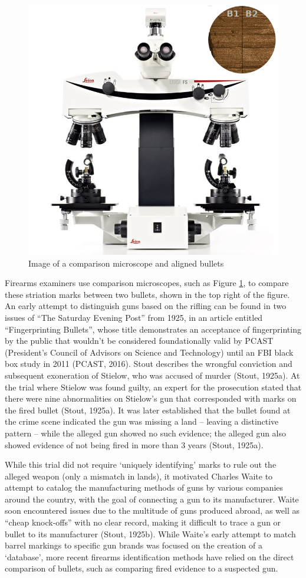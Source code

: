 \documentclass[print]{nuthesis}
\begin{document}
\begin{figure}

{\centering \includegraphics[width=0.5\linewidth]{images/microscope} 

}

\caption{Image of a comparison microscope and aligned bullets}\label{fig:microscope}
\end{figure}

Firearms examiners use comparison microscopes, such as Figure \ref{fig:microscope}, to compare these striation marks between two bullets, shown in the top right of the figure.
An early attempt to distinguish guns based on the rifling can be found in two issues of ``The Saturday Evening Post'' from 1925, in an article entitled ``Fingerprinting Bullets'', whose title demonstrates an acceptance of fingerprinting by the public that wouldn't be considered foundationally valid by PCAST (President's Council of Advisors on Science and Technology) until an FBI black box study in 2011 (PCAST, 2016).
Stout describes the wrongful conviction and subsequent exoneration of Stielow, who was accused of murder (Stout, 1925a).
At the trial where Stielow was found guilty, an expert for the prosecution stated that there were nine abnormalities on Stielow's gun that corresponded with marks on the fired bullet (Stout, 1925a).
It was later established that the bullet found at the crime scene indicated the gun was missing a land -- leaving a distinctive pattern -- while the alleged gun showed no such evidence; the alleged gun also showed evidence of not being fired in more than 3 years (Stout, 1925a).

While this trial did not require `uniquely identifying' marks to rule out the alleged weapon (only a mismatch in lands), it motivated Charles Waite to attempt to catalog the manufacturing methods of guns by various companies around the country, with the goal of connecting a gun to its manufacturer.
Waite soon encountered issues due to the multitude of guns produced abroad, as well as ``cheap knock-offs'' with no clear record, making it difficult to trace a gun or bullet to its manufacturer (Stout, 1925b).
While Waite's early attempt to match barrel markings to specific gun brands was focused on the creation of a `database', more recent firearms identification methods have relied on the direct comparison of bullets, such as comparing fired evidence to a suspected gun.
\end{document}
